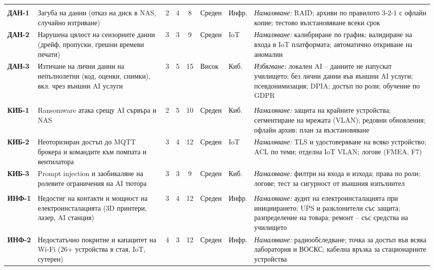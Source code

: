 \documentclass[11pt,a4paper]{article}
\begin{document}
\begin{xltabular}{\textwidth}{@{}>{\bfseries}l>{\raggedright\arraybackslash{}\hsize}X ccc >{\centering\arraybackslash}p{1.12cm}>{\raggedright\arraybackslash}p{1.05cm}>{\raggedright\arraybackslash{}\hsize}X@{}}
\\*
ДАН-1 & Загуба на данни (отказ на диск в NAS, случайно изтриване) & 2 & 4 & 8 & Среден & Инфр. & \textit{Намаляване:} RAID; архиви по правилото 3-2-1 с офлайн копие; тестово възстановяване всеки срок\\
ДАН-2 & Нарушена цялост на сензорните данни (дрейф, пропуски, грешни времеви печати) & 3 & 3 & 9 & Среден & IoT & \textit{Намаляване:} калибриране по график; валидиране на входа в IoT платформата; автоматично откриване на аномалии\\
ДАН-3 & Изтичане на лични данни на непълнолетни (код, оценки, снимки), вкл. чрез външни AI услуги & 3 & 5 & 15 & Висок & Киб. & \textit{Избягване:} локален AI – данните не напускат училището; без лични данни във външни AI услуги; псевдонимизация; DPIA; достъп по роли; обучение по GDPR\\
\\*
КИБ-1 & Ransomware атака срещу AI сървъра и NAS & 2 & 5 & 10 & Среден & Киб. & \textit{Намаляване:} защита на крайните устройства; сегментиране на мрежата (VLAN); редовни обновления; офлайн архив; план за възстановяване\\
КИБ-2 & Неоторизиран достъп до MQTT брокера и командите към помпата и вентилатора & 3 & 4 & 12 & Среден & IoT & \textit{Намаляване:} TLS и удостоверяване на всяко устройство; ACL по теми; отделна IoT VLAN; логове (FMEA, F7)\\
КИБ-3 & Prompt injection и заобикаляне на ролевите ограничения на AI тютора & 3 & 3 & 9 & Среден & Киб. & \textit{Намаляване:} филтри на входа и изхода; права по роли; логове; тест за сигурност от външния изпълнител\\
\\*
ИНФ-1 & Недостиг на контакти и мощност на електроинсталацията (3D принтери, лазер, AI станция) & 3 & 4 & 12 & Среден & Инфр. & \textit{Намаляване:} аудит на електроинсталацията при инициирането; UPS и разклонители със защита; разпределение на товара; ремонт – със средства на училището\\
ИНФ-2 & Недостатъчно покритие и капацитет на Wi-Fi (26+ устройства в стая, IoT, сутерен) & 4 & 3 & 12 & Среден & Инфр. & \textit{Намаляване:} радиообследване; точка за достъп във всяка лаборатория и ВОСКС; кабелна връзка за стационарните устройства\\

\end{xltabular}
\end{document}
